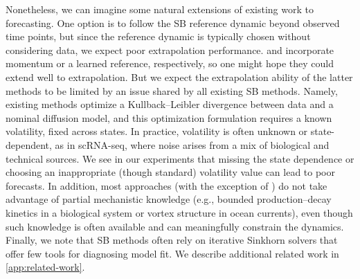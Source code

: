 Nonetheless, we can imagine some natural extensions of existing work to forecasting. One option is to follow the SB reference dynamic beyond observed time points, but since the reference dynamic is typically chosen without considering data, we expect poor extrapolation performance. \citet{chen2024deep} and \citet{shen2024multi} incorporate momentum or a learned reference, respectively, so one might hope they could extend well to extrapolation.
But we expect the extrapolation ability of the latter methods to be limited by an issue shared by all existing SB methods.
Namely, existing methods optimize a Kullback--Leibler divergence between data and a nominal diffusion model, and this optimization formulation requires a known volatility, fixed across states. In practice, volatility is often unknown or state-dependent, as in scRNA-seq, where noise arises from a mix of biological and technical sources. We see in our experiments that missing the state dependence or choosing an inappropriate (though standard) volatility value can lead to poor forecasts. In addition, most approaches (with the exception of \citet{shen2024multi}) do not take advantage of partial mechanistic knowledge (e.g., bounded production–decay kinetics in a biological system or vortex structure in ocean currents), even though such knowledge is often available and can meaningfully constrain the dynamics. Finally, we note that SB methods often rely on iterative Sinkhorn solvers
that offer %
few tools for diagnosing model fit. We describe additional related work in \cref{app:related-work}.

